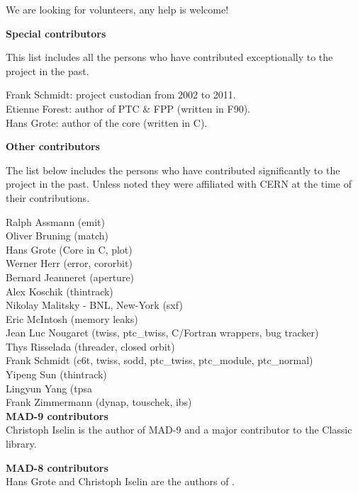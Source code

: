 We are looking for volunteers, any help is welcome!


{\bf Special contributors}

This list includes all the persons who have contributed exceptionally to the project in the past.

Frank Schmidt: project custodian from 2002 to 2011. \\
Etienne Forest: author of PTC \& FPP (written in F90). \\
Hans Grote: author of the core (written in C).


{\bf Other contributors}

The list below includes the persons who have contributed significantly
to the \madx project in the past. Unless noted they were affiliated with
CERN at the time of their contributions. 

Ralph Assmann  (emit) \\
Oliver Bruning (match) \\
Hans Grote (Core in C, plot) \\
Werner Herr (error, cororbit) \\
Bernard Jeanneret (aperture) \\
Alex Koschik (thintrack) \\
Nikolay Malitsky - BNL, New-York  (sxf) \\
Eric McIntosh (memory leaks) \\
Jean Luc Nougaret (twiss, ptc\_twiss, C/Fortran wrappers, bug tracker) \\
Thys Risselada (threader, closed orbit) \\
Frank Schmidt (c6t, twiss, sodd, ptc\_twiss, ptc\_module, ptc\_normal) \\
Yipeng Sun (thintrack) \\
Lingyun Yang (tpsa \\
Frank Zimmermann (dynap, touschek, ibs) \\

{\bf MAD-9 contributors}\\
Christoph Iselin is the author of MAD-9 and a major contributor to the Classic library.

{\bf MAD-8 contributors}\\
Hans Grote and Christoph Iselin are the authors of \madeight.

\newpage

